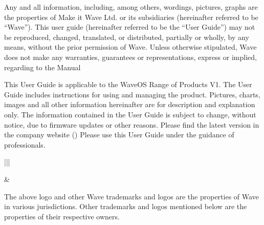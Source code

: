 \documentclass[letterpaper,10pt,english]{sphinxmanual}
\begin{document}
Any and all information, including, among others, wordings, pictures, graphs are the properties of Make it Wave Ltd. or its subsidiaries (hereinafter referred to be “Wave”). This user guide (hereinafter referred to be the “User Guide”) may not be reproduced, changed, translated, or distributed, partially or wholly, by any means, without the prior permission of Wave. Unless otherwise stipulated, Wave does not make any warranties, guarantees or representations, express or implied, regarding to the Manual


This User Guide is applicable to the WaveOS Range of Products V1.
The User Guide includes instructions for using and managing the product. Pictures, charts, images and all other information hereinafter are for description and explanation only. The information contained in the User Guide is subject to change, without notice, due to firmware updates or other reasons. Please find the latest version in the company website ()
Please use this User Guide under the guidance of professionals.



\begin{savenotes}\sphinxattablestart
\centering
\begin{tabular}[t]{|||}
\hline

\noindent{}
&
\\
\hline
\end{tabular}
\par
\sphinxattableend\end{savenotes}

The above logo and other Wave trademarks and logos are the properties of Wave in various jurisdictions. Other trademarks and logos mentioned below are the properties of their respective owners.

\end{document}
